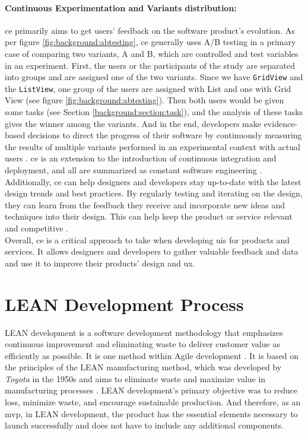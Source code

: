 \paragraph{Continuous Experimentation and Variants distribution:} 
\ac{ce} primarily aims to get users' feedback on the software product's evolution.
As per figure \ref{fig:background:abtesting}, \ac{ce} generally uses A/B testing in a primary case of comparing two variants, A and B, which are controlled and test variables in an experiment.
First, the users or the participants of the study are separated into groups and are assigned one of the two variants.
Since we have \texttt{GridView} and the \texttt{ListView}, one group of the users are assigned with List and one with Grid View (see figure \ref{fig:background:abtesting}).
Then both users would be given some tasks (see Section \ref{background:section:task}), and the analysis of these tasks gives the winner among the variants.
And in the end, developers make evidence-based decisions to direct the progress of their software by continuously measuring the results of multiple variants performed in an experimental context with actual users \cite{article:CE:ros}.
\ac{ce} is an extension to the introduction of continuous integration and deployment, and all are summarized as constant software engineering \cite{article:CE:fitzgerald}.
Additionally, \ac{ce} can help designers and developers stay up-to-date with the latest design trends and best practices. 
By regularly testing and iterating on the design, they can learn from the feedback they receive and incorporate new ideas and techniques into their design. 
This can help keep the product or service relevant and competitive \cite{article:controlled:experiements}.\\

Overall, \ac{ce} is a critical approach to take when developing \ac{ui}s for products and services. 
It allows designers and developers to gather valuable feedback and data and use it to improve their products' design and \ac{ux}.
\clearpage

\section{LEAN Development Process}
\label{background:section:lean}
LEAN development is a software development methodology that emphasizes continuous improvement and eliminating waste to deliver customer value as efficiently as possible. 
It is one method within Agile development \cite{misc:lean:tutorial}.
It is based on the principles of the LEAN manufacturing method, which was developed by \textit{Toyota} in the 1950s and aims to eliminate waste and maximize value in manufacturing processes \cite{misc:lean:toyota}.
LEAN development's primary objective was to reduce loss, minimize waste, and encourage sustainable production.
And therefore, as an \ac{mvp}, in LEAN development, the product has the essential elements necessary to launch successfully and does not have to include any additional components.

